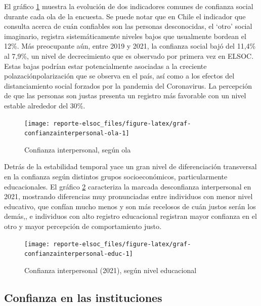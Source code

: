 \documentclass[
  12pt,
]{book}
\begin{document}
El gráfico \ref{fig:graf-confianzainterpersonal-ola} muestra la evolución de dos indicadores comunes de confianza social durante cada ola de la encuesta. Se puede notar que en Chile el indicador que consulta acerca de cuán confiables son las personas desconocidas, el `otro' social imaginario, registra sistemáticamente niveles bajos que usualmente bordean el 12\%. Más preocupante aún, entre 2019 y 2021, la confianza social bajó del 11,4\% al 7,9\%, un nivel de decrecimiento que es observado por primera vez en ELSOC. Estas bajas podrían estar potencialmente asociadas a la creciente polazaciónpolarización que se observa en el país, así como a los efectos del distanciamiento social forzados por la pandemia del Coronavirus. La percepción de que las personas son justas presenta un registro más favorable con un nivel estable alrededor del 30\%.

\begin{figure}

{\centering \texttt{[image: reporte-elsoc\_files/figure-latex/graf-confianzainterpersonal-ola-1]} 

}

\caption{Confianza interpersonal, según ola}\label{fig:graf-confianzainterpersonal-ola}
\end{figure}

Detrás de la estabilidad temporal yace un gran nivel de diferenciación transversal en la confianza según distintos grupos socioeconómicos, particularmente educacionales. El gráfico \ref{fig:graf-confianzainterpersonal-educ} caracteriza la marcada desconfianza interpersonal en 2021, mostrando diferencias muy pronunciadas entre individuos con menor nivel educativo, que confían mucho menos y son más recelosos de cuán justos serán los demás,, e individuos con alto registro educacional registran mayor confianza en el otro y mayor percepción de comportamiento justo.

\begin{figure}

{\centering \texttt{[image: reporte-elsoc\_files/figure-latex/graf-confianzainterpersonal-educ-1]} 

}

\caption{Confianza interpersonal (2021), según nivel educacional}\label{fig:graf-confianzainterpersonal-educ}
\end{figure}

\hypertarget{confianza-en-las-instituciones}{%
\subsection*{Confianza en las instituciones}\label{confianza-en-las-instituciones}}
\end{document}
